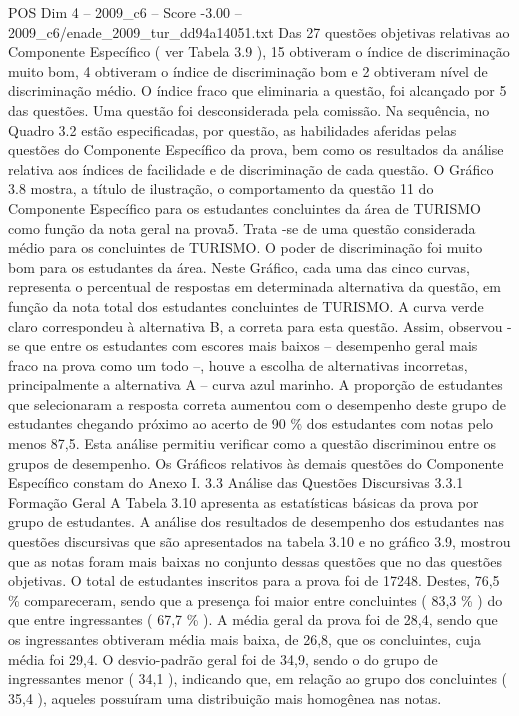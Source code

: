 \begin{textsample}{POS Dim 4 – 2009\_c6 – Score -3.00 – 2009\_c6/enade\_2009\_tur\_dd94a14051.txt}
Das 27 questões objetivas relativas ao Componente Específico ( ver Tabela 3.9 ), 15 obtiveram o índice de discriminação muito bom, 4 obtiveram o índice de discriminação bom e 2 obtiveram nível de discriminação médio.
O índice fraco que eliminaria a questão, foi alcançado por 5 das questões.
Uma questão foi desconsiderada pela comissão.
Na sequência, no Quadro 3.2 estão especificadas, por questão, as habilidades aferidas pelas questões do Componente Específico da prova, bem como os resultados da análise relativa aos índices de facilidade e de discriminação de cada questão.
O Gráfico 3.8 mostra, a título de ilustração, o comportamento da questão 11 do Componente Específico para os estudantes concluintes da área de TURISMO como função da nota geral na prova5.
Trata -se de uma questão considerada médio para os concluintes de TURISMO.
O poder de discriminação foi muito bom para os estudantes da área.
Neste Gráfico, cada uma das cinco curvas, representa o percentual de respostas em determinada alternativa da questão, em função da nota total dos estudantes concluintes de TURISMO.
A curva verde claro correspondeu à alternativa B, a correta para esta questão.
Assim, observou -se que entre os estudantes com escores mais baixos – desempenho geral mais fraco na prova como um todo –, houve a escolha de alternativas incorretas, principalmente a alternativa A – curva azul marinho.
A proporção de estudantes que selecionaram a resposta correta aumentou com o desempenho deste grupo de estudantes chegando próximo ao acerto de 90 \% dos estudantes com notas pelo menos 87,5.
Esta análise permitiu verificar como a questão discriminou entre os grupos de desempenho.
Os Gráficos relativos às demais questões do Componente Específico constam do Anexo I. 3.3 Análise das Questões Discursivas 3.3.1 Formação Geral A Tabela 3.10 apresenta as estatísticas básicas da prova por grupo de estudantes.
A análise dos resultados de desempenho dos estudantes nas questões discursivas que são apresentados na tabela 3.10 e no gráfico 3.9, mostrou que as notas foram mais baixas no conjunto dessas questões que no das questões objetivas.
O total de estudantes inscritos para a prova foi de 17248.
Destes, 76,5 \% compareceram, sendo que a presença foi maior entre concluintes ( 83,3 \% ) do que entre ingressantes ( 67,7 \% ).
A média geral da prova foi de 28,4, sendo que os ingressantes obtiveram média mais baixa, de 26,8, que os concluintes, cuja média foi 29,4.
O desvio-padrão geral foi de 34,9, sendo o do grupo de ingressantes menor ( 34,1 ), indicando que, em relação ao grupo dos concluintes ( 35,4 ), aqueles possuíram uma distribuição mais homogênea nas notas.

\end{textsample}
